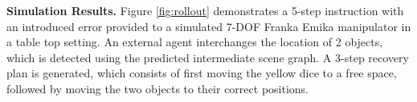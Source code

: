 \textbf{Simulation Results. }
Figure \ref{fig:rollout} demonstrates a 5-step instruction with an introduced error provided to a simulated 7-DOF Franka Emika manipulator in a table top setting. An external agent interchanges the location of 2 objects, which is detected using the predicted intermediate scene graph. A 3-step recovery plan is generated, which consists of first moving the yellow dice to a free space, followed by moving the two objects to their correct positions.

